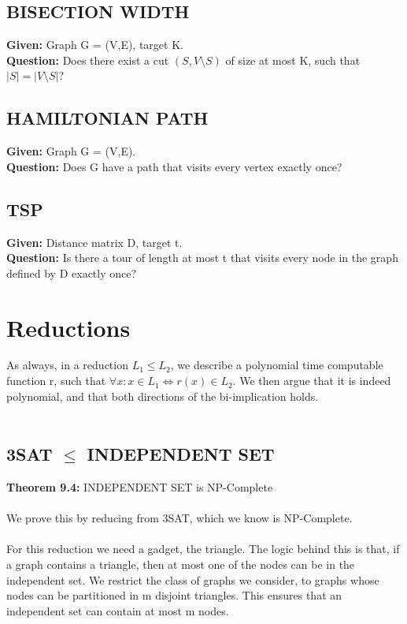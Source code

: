 \documentclass{article}
\begin{document}
\subsection{BISECTION WIDTH}
\textbf{Given:} Graph G = (V,E), target K.\\
\textbf{Question:} Does there exist a cut  $(S,V\setminus S)$ of size at most K, such that $|S| =  |V \setminus S|$?
\subsection{HAMILTONIAN PATH}
\textbf{Given:} Graph G = (V,E).\\
\textbf{Question:} Does G have a path that visits every vertex exactly once?\\
\subsection{TSP}
\textbf{Given:} Distance matrix D, target t. \\
\textbf{Question:} Is there a tour of length at most t that visits every node in the graph defined by D exactly once?\\
\section{Reductions}
As always, in a reduction $L_1 \le L_2$, we describe a polynomial time computable function r, such that $\forall x: x\in L_1 \iff r(x) \in L_2$. We then argue that it is indeed polynomial, and that both directions of the bi-implication holds.\\\\
\subsection{3SAT $\le$ INDEPENDENT SET}
\textbf{Theorem 9.4:} INDEPENDENT SET is NP-Complete\\\\
We prove this by reducing from 3SAT, which we know is NP-Complete.\\\\
For this reduction we need a gadget, the triangle. The logic behind this is that, if a graph contains a triangle, then at most one of the nodes can be in the independent set. We restrict the class of graphs we consider, to graphs whose nodes can be partitioned in m disjoint triangles. This ensures that an independent set can contain at most m nodes. \\
\end{document}
